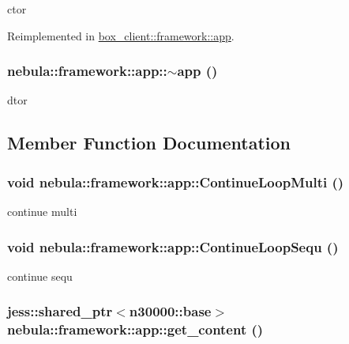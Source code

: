 ctor 

Reimplemented in \hyperlink{classbox__client_1_1framework_1_1app_ab7875665a67c5ad9ca66e0250242f994}{box\_\-client::framework::app}.\hypertarget{classnebula_1_1framework_1_1app_a0c5adf8d5fbc01a2b9d339aca9df63a7}{
\subsubsection[{$\sim$app}]{\setlength{\rightskip}{0pt plus 5cm}nebula::framework::app::$\sim$app ()}}
\label{classnebula_1_1framework_1_1app_a0c5adf8d5fbc01a2b9d339aca9df63a7}


dtor 

\subsection{Member Function Documentation}
\hypertarget{classnebula_1_1framework_1_1app_a23ba61308754945c590aa257aa0b8a27}{
\subsubsection[{ContinueLoopMulti}]{\setlength{\rightskip}{0pt plus 5cm}void nebula::framework::app::ContinueLoopMulti ()}}
\label{classnebula_1_1framework_1_1app_a23ba61308754945c590aa257aa0b8a27}


continue multi \hypertarget{classnebula_1_1framework_1_1app_a0f69a7ae0f734eb2f61468c9d0101862}{
\subsubsection[{ContinueLoopSequ}]{\setlength{\rightskip}{0pt plus 5cm}void nebula::framework::app::ContinueLoopSequ ()}}
\label{classnebula_1_1framework_1_1app_a0f69a7ae0f734eb2f61468c9d0101862}


continue sequ \hypertarget{classnebula_1_1framework_1_1app_aaf19f1ba7f31909c8e05028cf125f330}{
\subsubsection[{get\_\-content}]{\setlength{\rightskip}{0pt plus 5cm}jess::shared\_\-ptr$<${\bf n30000::base}$>$ nebula::framework::app::get\_\-content ()}}
\label{classnebula_1_1framework_1_1app_aaf19f1ba7f31909c8e05028cf125f330}


